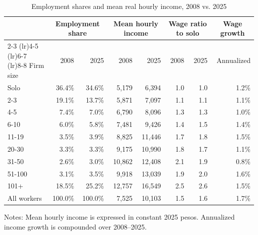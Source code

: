 \begin{table}[htbp]
  \centering
  \caption{Employment shares and mean real hourly income, 2008 vs. 2025}
  \label{tab:descriptive-core-size-2008-2025}
  \small
  \begin{tabular}{lrrrrrrr}
    \toprule
    & \multicolumn{2}{c}{Employment share} & \multicolumn{2}{c}{Mean hourly income} & \multicolumn{2}{c}{Wage ratio to solo} & \multicolumn{1}{c}{Wage growth} \\
    \cmidrule(lr){2-3} \cmidrule(lr){4-5} \cmidrule(lr){6-7} \cmidrule(lr){8-8}
    Firm size & 2008 & 2025 & 2008 & 2025 & 2008 & 2025 & Annualized \\
    \midrule
    Solo & 36.4\% & 34.6\% & 5,179 & 6,394 & 1.0 & 1.0 & 1.2\% \\
    2-3 & 19.1\% & 13.7\% & 5,871 & 7,097 & 1.1 & 1.1 & 1.1\% \\
    4-5 & 7.4\% & 7.0\% & 6,790 & 8,096 & 1.3 & 1.3 & 1.0\% \\
    6-10 & 6.0\% & 5.8\% & 7,481 & 9,426 & 1.4 & 1.5 & 1.4\% \\
    11-19 & 3.5\% & 3.9\% & 8,825 & 11,446 & 1.7 & 1.8 & 1.5\% \\
    20-30 & 3.3\% & 3.3\% & 9,175 & 10,990 & 1.8 & 1.7 & 1.1\% \\
    31-50 & 2.6\% & 3.0\% & 10,862 & 12,408 & 2.1 & 1.9 & 0.8\% \\
    51-100 & 3.1\% & 3.5\% & 9,918 & 13,039 & 1.9 & 2.0 & 1.6\% \\
    101+ & 18.5\% & 25.2\% & 12,757 & 16,549 & 2.5 & 2.6 & 1.5\% \\
    \addlinespace
    All workers & 100.0\% & 100.0\% & 7,525 & 10,103 & 1.5 & 1.6 & 1.7\% \\
    \bottomrule
  \end{tabular}
  \vspace{0.3em}
  \begin{minipage}{0.95\textwidth}
  \footnotesize
  Notes: Mean hourly income is expressed in constant 2025 pesos. Annualized income growth is compounded over 2008--2025.
  \end{minipage}
\end{table}
